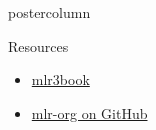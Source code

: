 \documentclass{beamer}
\begin{document}
\begin{frame}[fragile]{}
\begin{columns}
\begin{column}{.31\textwidth}
\begin{beamercolorbox}[center]{postercolumn}
\begin{minipage}{.98\textwidth}
{\begin{myblock}{Resources}
\begin{itemize}
							\item \href{https://mlr3book.mlr-org.com/index.html}{mlr3book}
							\item \href{https://github.com/mlr-org}{mlr-org on GitHub} 
						\end{itemize}
					\end{myblock}\vfill
				}
			\end{minipage}
		\end{beamercolorbox}
	\end{column}
\end{columns}
\end{frame}
\end{document}
